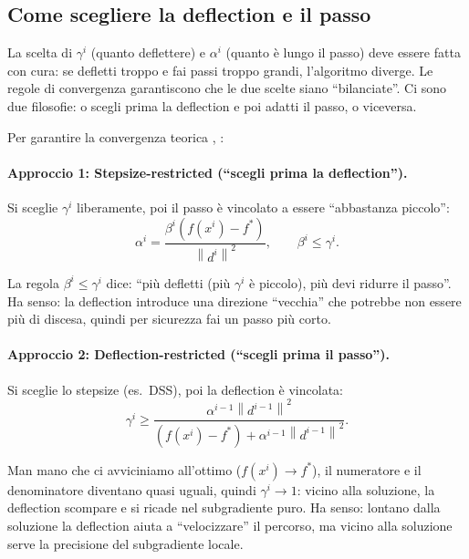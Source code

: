 \documentclass[a4paper,11pt]{article}
\theoremstyle{definition}
\newcommand{\norm}[1]{\left\lVert #1 \right\rVert}
\begin{document}
\subsection{Come scegliere la deflection e il passo}
\label{subsec:defl_convergence}

\begin{intuizione}
La scelta di $\gamma^i$ (quanto deflettere) e $\alpha^i$ (quanto è lungo il passo) deve essere fatta con cura: se defletti troppo e fai passi troppo grandi, l'algoritmo diverge. Le regole di convergenza garantiscono che le due scelte siano ``bilanciate''. Ci sono due filosofie: o scegli prima la deflection e poi adatti il passo, o viceversa.
\end{intuizione}

Per garantire la convergenza teorica \cite[slide~15, set~5]{opt-slides}, \cite{dantonio2009}:

\paragraph{Approccio 1: Stepsize-restricted (``scegli prima la deflection'').}
Si sceglie $\gamma^i$ liberamente, poi il passo è vincolato a essere ``abbastanza piccolo'':
\[
  \alpha^i = \frac{\beta^i(f(x^i) - f^*)}{\norm{d^i}^2}, \qquad \beta^i \leq \gamma^i.
\]
\begin{intuizione}
La regola $\beta^i \leq \gamma^i$ dice: ``più defletti (più $\gamma^i$ è piccolo), più devi ridurre il passo''. Ha senso: la deflection introduce una direzione ``vecchia'' che potrebbe non essere più di discesa, quindi per sicurezza fai un passo più corto.
\end{intuizione}

\paragraph{Approccio 2: Deflection-restricted (``scegli prima il passo'').}
Si sceglie lo stepsize (es.\ DSS), poi la deflection è vincolata:
\[
  \gamma^i \geq \frac{\alpha^{i-1}\norm{d^{i-1}}^2}{(f(x^i) - f^*) + \alpha^{i-1}\norm{d^{i-1}}^2}.
\]
\begin{intuizione}
Man mano che ci avviciniamo all'ottimo ($f(x^i) \to f^*$), il numeratore e il denominatore diventano quasi uguali, quindi $\gamma^i \to 1$: vicino alla soluzione, la deflection scompare e si ricade nel subgradiente puro. Ha senso: lontano dalla soluzione la deflection aiuta a ``velocizzare'' il percorso, ma vicino alla soluzione serve la precisione del subgradiente locale.
\end{intuizione}
\end{document}
